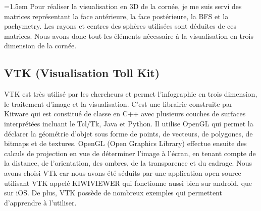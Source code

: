 \documentclass[a4paper,12pt]{article}
\begin{document}
\vspace{0.25cm}
\parindent=1.5em
 Pour réaliser la visualisation en 3D de la cornée, je me suis servi des matrices représentant la face antérieure, la face postérieure, la BFS et la pachymetry. Les rayons et centres des sphères utilisées sont déduites de ces matrices. Nous avons donc tout les éléments nécessaire à la visualisation en trois dimension de la cornée.

	\subsection{VTK (Visualisation Toll Kit)}
	 VTK est très utilisé par les chercheurs et permet l'infographie en trois dimension, le traitement d'image et la visualisation. C'est une librairie construite par Kitware qui est constitué de classe en C++ avec plusieurs couches de surfaces interprétées incluant le Tcl/Tk, Java et Python. Il utilise OpenGL qui permet la déclarer la géométrie d'objet sous forme de points, de vecteurs, de polygones, de bitmaps et de textures. OpenGL (Open Graphics Library) effectue ensuite des calculs de projection en vue de déterminer l'image à l'écran, en tenant compte de la distance, de l'orientation, des ombres, de la transparence et du cadrage. Nous avons choisi VTk car nous avons été séduits par une application open-source utilisant VTK appelé KIWIVIEWER qui fonctionne aussi bien sur android, que sur iOS. De plus, VTK possède de nombreux exemples qui permettent d'apprendre à l'utiliser.
	
\end{document}
